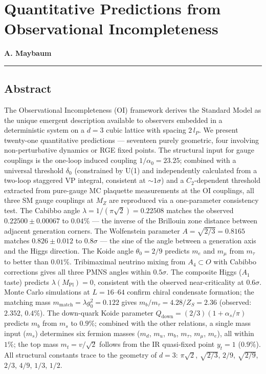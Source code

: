 \documentclass[
  11pt,
]{article}
\author{}
\date{}
\begin{document}
\hypertarget{quantitative-predictions-from-observational-incompleteness}{%
\section{Quantitative Predictions from Observational
Incompleteness}\label{quantitative-predictions-from-observational-incompleteness}}

\textbf{A. Maybaum}

\begin{center}\rule{0.5\linewidth}{0.5pt}\end{center}

\hypertarget{abstract}{%
\subsection{Abstract}\label{abstract}}

The Observational Incompleteness (OI) framework derives the Standard
Model as the unique emergent description available to observers embedded
in a deterministic system on a \(d = 3\) cubic lattice with spacing
\(2\,l_P\). We present twenty-one quantitative predictions --- seventeen
purely geometric, four involving non-perturbative dynamics or RGE fixed
points. The structural input for gauge couplings is the one-loop induced
coupling \(1/\alpha_0 = 23.25\); combined with a universal threshold
\(\delta_0\) (constrained by U(1) and independently calculated from a
two-loop staggered VP integral, consistent at \(\sim 1\sigma\)) and a
\(C_2\)-dependent threshold extracted from pure-gauge MC plaquette
measurements at the OI couplings, all three SM gauge couplings at
\(M_Z\) are reproduced via a one-parameter consistency test. The Cabibbo
angle \(\lambda = 1/(\pi\sqrt{2}) = 0.22508\) matches the observed
\(0.22500 \pm 0.00067\) to \(0.04\%\) --- the inverse of the Brillouin
zone distance between adjacent generation corners. The Wolfenstein
parameter \(A = \sqrt{2/3} = 0.8165\) matches \(0.826 \pm 0.012\) to
\(0.8\sigma\) --- the sine of the angle between a generation axis and
the Higgs direction. The Koide angle \(\theta_0 = 2/9\) predicts \(m_e\)
and \(m_\mu\) from \(m_\tau\) to better than \(0.01\%\). Tribimaximal
neutrino mixing from \(A_4 \subset O\) with Cabibbo corrections gives
all three PMNS angles within \(0.5\sigma\). The composite Higgs (\(A_1\)
taste) predicts \(\lambda(M_{\text{Pl}}) = 0\), consistent with the
observed near-criticality at \(0.6\sigma\). Monte Carlo simulations at
\(L = 16\)--\(64\) confirm chiral condensate formation; the matching
mass \(m_{\text{match}} = \lambda g_0^2 = 0.122\) gives
\(m_b/m_\tau = 4.28/Z_S = 2.36\) (observed: \(2.352\), \(0.4\%\)). The
down-quark Koide parameter \(Q_{\text{down}} = (2/3)(1 + \alpha_s/\pi)\)
predicts \(m_b\) from \(m_s\) to \(0.9\%\); combined with the other
relations, a single mass input (\(m_s\)) determines six fermion masses
(\(m_d\), \(m_u\), \(m_b\), \(m_\tau\), \(m_\mu\), \(m_e\)), all within
\(1\%\); the top mass \(m_t = v/\sqrt{2}\) follows from the IR
quasi-fixed point \(y_t = 1\) (\(0.9\%\)). All structural constants
trace to the geometry of \(d = 3\): \(\pi\sqrt{2}\), \(\sqrt{2/3}\),
\(2/9\), \(\sqrt{2/9}\), \(2/3\), \(4/9\), \(1/3\), \(1/2\).
\end{document}
